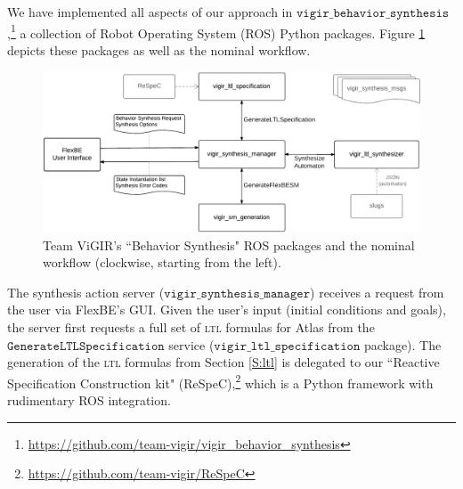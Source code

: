 
We have implemented all aspects of our approach in $\mathtt{vigir\_behavior\_synthesis}$,\footnote{\scriptsize{\url{https://github.com/team-vigir/vigir_behavior_synthesis}}}
 a collection of Robot Operating System (ROS) Python packages.
Figure \ref{Fig:vigir_behavior_synthesis} depicts these packages as well as the nominal workflow.

\begin{figure}[t]
\centering
\includegraphics[width=\columnwidth,clip]{./img/behavior_synthesis_packages.png}
\caption{
	Team ViGIR's ``Behavior Synthesis" ROS packages and the nominal workflow (clockwise, starting from the left).
}
\label{Fig:vigir_behavior_synthesis}
\end{figure}

The synthesis action server ($\mathtt{vigir\_synthesis\_manager}$) receives a request from the user via FlexBE's GUI.
Given the user's input (initial conditions and goals), the server first requests a full set of \textsc{ltl} formulas for Atlas from the $\mathtt{Generate LTL Specification}$ service ($\mathtt{vigir\_ltl\_specification}$ package).
The generation of the \textsc{ltl} formulas from Section \ref{S:ltl} is delegated to our ``Reactive Specification Construction kit" (ReSpeC),\footnote{\scriptsize{\url{https://github.com/team-vigir/ReSpeC}}}
 which is a Python framework with rudimentary ROS integration.


